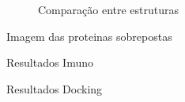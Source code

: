 \begin{figure}%
    \centering
    \qquad
    \caption{Comparação entre estruturas}%
    \label{fig:example}%
\end{figure}

{\color{red} Imagem das proteinas sobrepostas}

{\color{red} Resultados Imuno}

{\color{red} Resultados Docking}